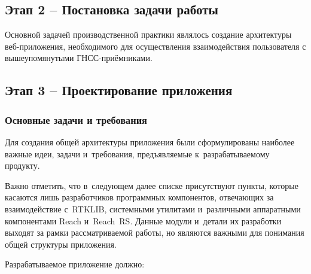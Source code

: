 \documentclass[pta]{../../../scs-iam}
\begin{document}

\subsection{Этап 2 -- Постановка задачи работы}

Основной задачей производственной практики являлось создание архитектуры веб-приложения, необходимого для осуществления взаимодействия пользователя с вышеупомянутыми ГНСС-приёмниками.

\subsection{Этап 3 -- Проектирование приложения}

\subsubsection{Основные задачи и требования}

Для создания общей архитектуры приложения были сформулированы наиболее важные идеи, задачи и~требования, предъявляемые к~разрабатываемому продукту.

Важно отметить, что в~следующем далее списке присутствуют пункты, которые касаются лишь разработчиков программных компонентов, отвечающих за взаимодействие с~RTKLIB, системными утилитами и~различными аппаратными компонентами Reach и~Reach~RS. Данные модули и~детали их разработки выходят за рамки рассматриваемой работы, но являются важными для понимания общей структуры приложения.

Разрабатываемое приложение должно:
\end{document}
